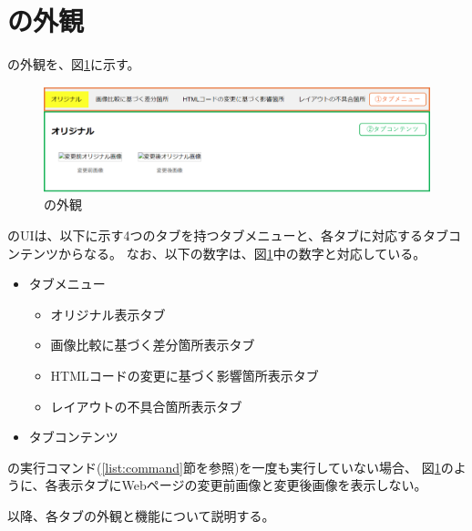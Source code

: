 \section{\toolName の外観}\label{sec:MixVRT_Appearance}
\toolName の外観を、図\ref{fig: Appearance}に示す。
\begin{figure}[tp]
    \begin{center}
        \includegraphics[width=1.0\columnwidth]{image/3_Appearance3.png}
        \caption{\toolName の外観}
        \label{fig: Appearance}
    \end{center}
\end{figure}
\toolName のUIは、以下に示す4つのタブを持つタブメニューと、各タブに対応するタブコンテンツからなる。
なお、以下の数字は、図\ref{fig: Appearance}中の数字と対応している。
\begin{itemize}
    \item[①] タブメニュー
          \begin{itemize}
              \item オリジナル表示タブ
              \item 画像比較に基づく差分箇所表示タブ
              \item HTMLコードの変更に基づく影響箇所表示タブ
              \item レイアウトの不具合箇所表示タブ
          \end{itemize}
    \item[②] タブコンテンツ
\end{itemize}
\par
\toolName の実行コマンド(\ref{list:command}節を参照)を一度も実行していない場合、
図\ref{fig: Appearance}のように、各表示タブにWebページの変更前画像と変更後画像を表示しない。
\par
以降、各タブの外観と機能について説明する。

